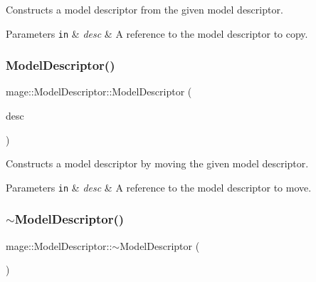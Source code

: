 Constructs a model descriptor from the given model descriptor.


\begin{DoxyParams}[1]{Parameters}
\mbox{\tt in}  & {\em desc} & A reference to the model descriptor to copy. \\
\hline
\end{DoxyParams}
\hypertarget{classmage_1_1_model_descriptor_af5ece586e2a8404cc29e703885531e72}{}\label{classmage_1_1_model_descriptor_af5ece586e2a8404cc29e703885531e72} 
\subsubsection{\texorpdfstring{Model\+Descriptor()}{ModelDescriptor()}\hspace{0.1cm}{\footnotesize\ttfamily [3/3]}}
{\footnotesize\ttfamily mage\+::\+Model\+Descriptor\+::\+Model\+Descriptor (\begin{DoxyParamCaption}\item[{\hyperlink{classmage_1_1_model_descriptor}{Model\+Descriptor} \&\&}]{desc }\end{DoxyParamCaption})\hspace{0.3cm}{\ttfamily [default]}}

Constructs a model descriptor by moving the given model descriptor.


\begin{DoxyParams}[1]{Parameters}
\mbox{\tt in}  & {\em desc} & A reference to the model descriptor to move. \\
\hline
\end{DoxyParams}
\hypertarget{classmage_1_1_model_descriptor_aae13cf050ee7f9283d91282c04f62df1}{}\label{classmage_1_1_model_descriptor_aae13cf050ee7f9283d91282c04f62df1} 
\subsubsection{\texorpdfstring{$\sim$\+Model\+Descriptor()}{~ModelDescriptor()}}
{\footnotesize\ttfamily mage\+::\+Model\+Descriptor\+::$\sim$\+Model\+Descriptor (\begin{DoxyParamCaption}{ }\end{DoxyParamCaption})\hspace{0.3cm}{\ttfamily [virtual]}}

